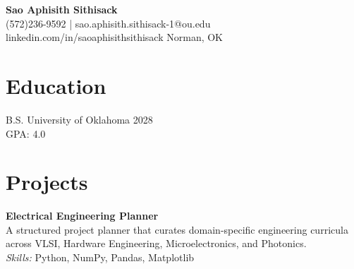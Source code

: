 \documentclass[11pt,letterpaper]{article}
\begin{document}
\begin{center}
{\LARGE \textbf{Sao Aphisith Sithisack}}\\[2pt]
\small (572)236-9592 | sao.aphisith.sithisack-1@ou.edu \textbullet{} linkedin.com/in/saoaphisithsithisack \textbullet{} Norman, OK
\end{center}
\section*{Education}
\noindent B.S. \textbar{} University of Oklahoma \textbar{} 2028\\
GPA: 4.0\\
\section*{Projects}
\noindent\textbf{Electrical Engineering Planner}\\
A structured project planner that curates domain-specific engineering curricula across VLSI, Hardware Engineering, Microelectronics, and Photonics.\\
\textit{Skills:} Python, NumPy, Pandas, Matplotlib
\end{document}
